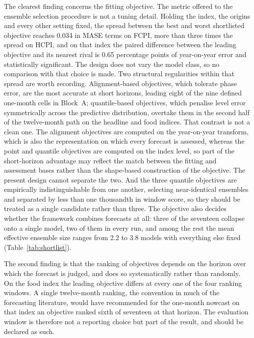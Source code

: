 \documentclass[12pt]{article}
\begin{document}
The clearest finding concerns the fitting objective. The metric offered to the
ensemble selection procedure is not a tuning detail. Holding the index, the
origins and every other setting fixed, the spread between the best and worst
shortlisted objective reaches 0.034 in MASE terms on FCPI, more than three
times the spread on HCPI, and on that index the paired difference between the
leading objective and its nearest rival is 0.65 percentage points of
year-on-year error and statistically significant. The design does not vary the
model class, so no comparison with that choice is made. Two
structural regularities within that spread are worth recording. Alignment-based
objectives, which tolerate phase error, are the most accurate at short
horizons, leading eight of the nine defined one-month cells in Block~A;
quantile-based objectives, which penalise level error symmetrically across the
predictive distribution, overtake them in the second half of the twelve-month
path on the headline and food indices. That contrast is not a clean one. The
alignment objectives are computed on the year-on-year transform, which is also
the representation on which every forecast is assessed, whereas the point and
quantile objectives are computed on the index level, so part of the
short-horizon advantage may reflect the match between the fitting and
assessment bases rather than the shape-based construction of the objective.
The present design cannot separate the two. And the three quantile objectives are
empirically indistinguishable from one another, selecting near-identical
ensembles and separated by less than one thousandth in window score, so they
should be treated as a single candidate rather than three. The objective also
decides whether the framework combines forecasts at all: three of the seventeen
collapse onto a single model, two of them in every run, and among the rest the
mean effective ensemble size ranges from 2.2 to 3.8 models with everything else
fixed (Table~\ref{tab:shortlist}).

The second finding is that the ranking of objectives depends on the horizon
over which the forecast is judged, and does so systematically rather than
randomly. On the food index the leading objective differs at every one of the
four ranking windows. A single twelve-month ranking, the convention in much of
the forecasting literature, would have recommended for the one-month nowcast on
that index an objective ranked sixth of seventeen at that horizon. The evaluation window is
therefore not a reporting choice but part of the result, and should be declared
as such.
\end{document}
